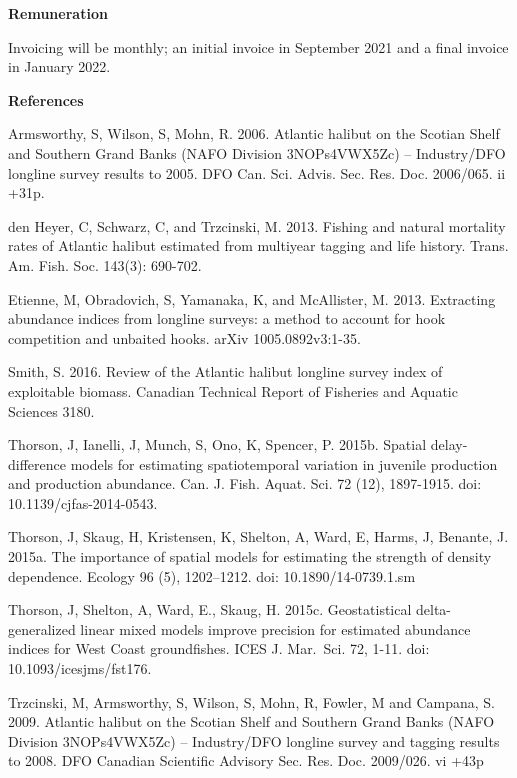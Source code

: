 \documentclass[12pt]{article}\usepackage[]{graphicx}\usepackage[]{color}
\begin{document}
\begin{appendices}
\textbf{Remuneration}

Invoicing will be monthly; an initial invoice in September 2021 and a final invoice in January 2022.

\textbf{References}

Armsworthy, S, Wilson, S, Mohn, R. 2006. Atlantic halibut on the Scotian Shelf and Southern Grand Banks (NAFO Division 3NOPs4VWX5Zc) -- Industry/DFO longline survey results to 2005. DFO Can. Sci. Advis. Sec. Res. Doc. 2006/065. ii +31p.

den Heyer, C, Schwarz, C, and Trzcinski, M. 2013. Fishing and natural mortality rates of Atlantic halibut estimated from multiyear tagging and life history. Trans. Am. Fish. Soc. 143(3): 690-702.

Etienne, M, Obradovich, S, Yamanaka, K, and McAllister, M. 2013. Extracting abundance indices from longline surveys: a method to account for hook competition and unbaited hooks. arXiv 1005.0892v3:1-35.

Smith, S. 2016. Review of the Atlantic halibut longline survey index of exploitable biomass. Canadian Technical Report of Fisheries and Aquatic Sciences 3180.

Thorson, J, Ianelli, J, Munch, S, Ono, K, Spencer, P. 2015b. Spatial delay-difference models for estimating spatiotemporal variation in juvenile production and production abundance. Can. J. Fish. Aquat. Sci. 72 (12), 1897-1915. doi: 10.1139/cjfas-2014-0543.

Thorson, J, Skaug, H, Kristensen, K, Shelton, A, Ward, E, Harms, J, Benante, J. 2015a. The importance of spatial models for estimating the strength of density dependence. Ecology 96 (5), 1202--1212. doi: 10.1890/14-0739.1.sm

Thorson, J, Shelton, A, Ward, E., Skaug, H. 2015c. Geostatistical delta-generalized linear mixed models improve precision for estimated abundance indices for West Coast groundfishes. ICES J. Mar.~Sci. 72, 1-11. doi: 10.1093/icesjms/fst176.

Trzcinski, M, Armsworthy, S, Wilson, S, Mohn, R, Fowler, M and Campana, S. 2009. Atlantic halibut on the Scotian Shelf and Southern Grand Banks (NAFO Division 3NOPs4VWX5Zc) -- Industry/DFO longline survey and tagging results to 2008. DFO Canadian Scientific Advisory Sec. Res. Doc. 2009/026. vi +43p

\clearpage

\section{}
\label{app:second-appendix}
\begin{figure}[htb]


\end{figure}
\end{appendices}
\end{document}
